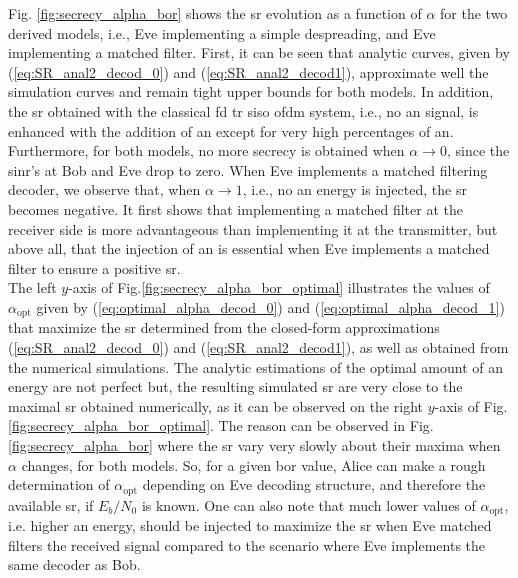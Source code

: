 Fig. \ref{fig:secrecy_alpha_bor} shows the \gls{sr} evolution as a function of $\alpha$ for the two derived models, i.e., Eve implementing a simple despreading, and Eve implementing a matched filter. First, it can be seen that analytic curves, given by (\ref{eq:SR_anal2_decod_0}) and (\ref{eq:SR_anal2_decod1}), approximate well the simulation curves and remain tight upper bounds for both models.  In addition, the \gls{sr} obtained with the classical \gls{fd} \gls{tr} \gls{siso} \gls{ofdm} system, i.e., no \gls{an} signal, is enhanced with the addition of \gls{an} except for very high percentages of \gls{an}. Furthermore, for both models, no more secrecy is obtained when $\alpha \to 0$, since the \gls{sinr}'s at Bob and Eve drop to zero. When Eve implements a matched filtering decoder, we observe that, when $\alpha \to 1$, i.e., no \gls{an} energy is injected, the \gls{sr} becomes negative. It first shows that implementing a matched filter at the receiver side is more advantageous than implementing it at the transmitter, but above all, that the injection of \gls{an} is essential when Eve implements a matched filter to ensure a positive \gls{sr}.\\

The left $y$-axis of Fig.\ref{fig:secrecy_alpha_bor_optimal} illustrates the values of $\alpha_{\text{opt}}$ given by (\ref{eq:optimal_alpha_decod_0}) and (\ref{eq:optimal_alpha_decod_1}) that maximize the \gls{sr} determined from the closed-form approximations (\ref{eq:SR_anal2_decod_0}) and (\ref{eq:SR_anal2_decod1}), as well as obtained from the numerical simulations. The analytic estimations of the optimal amount of \gls{an} energy are not perfect but, the resulting simulated \gls{sr} are very close to the maximal \gls{sr} obtained numerically, as it can be observed on the right $y$-axis of Fig.\ref{fig:secrecy_alpha_bor_optimal}. The reason can be observed in Fig. \ref{fig:secrecy_alpha_bor} where the \gls{sr} vary very slowly about their maxima when $\alpha$ changes, for both models. So, for a given \gls{bor} value, Alice can make a rough determination of $\alpha_{\text{opt}}$ depending on Eve decoding structure, and therefore the available \gls{sr}, if $E_b/N_0$ is known. One can also note that much lower values of $\alpha_{\text{opt}}$, i.e. higher \gls{an} energy, should be injected to maximize the \gls{sr} when Eve matched filters the received signal compared to the scenario where Eve implements the same decoder as Bob.







